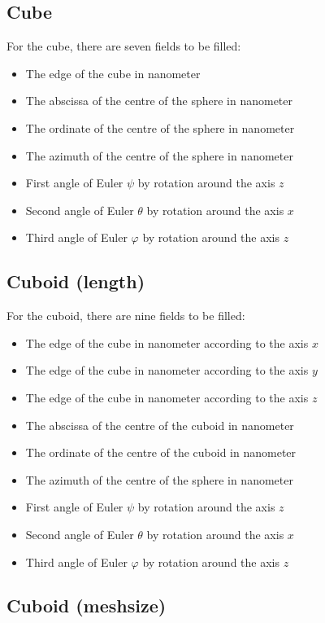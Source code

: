 \subsection{Cube}

For the cube, there are seven fields to be filled:

\begin{itemize}
\item The edge of the cube in nanometer
\item The abscissa of the centre of the sphere in nanometer
\item The ordinate of the centre of the sphere in nanometer
\item The azimuth of the centre of the sphere in nanometer
\item First angle of Euler $\psi$ by rotation around the axis $z$
\item Second angle of Euler $\theta$ by rotation around the axis $x$
\item Third angle of Euler $\varphi$ by rotation around the axis $z$
\end{itemize}

\subsection{Cuboid (length)}

For the cuboid, there are nine fields to be filled:

\begin{itemize}
\item The edge of the cube in nanometer according to the axis $x$
\item The edge of the cube in nanometer according to the axis $y$
\item The edge of the cube in nanometer according to the axis $z$
\item The abscissa of the centre of the cuboid in nanometer
\item The ordinate of the centre of the cuboid in nanometer
\item The azimuth of the centre of the sphere in nanometer
\item First angle of Euler $\psi$ by rotation around the axis $z$
\item Second angle of Euler $\theta$ by rotation around the axis $x$
\item Third angle of Euler $\varphi$ by rotation around the axis $z$
\end{itemize}

\subsection{Cuboid (meshsize)}

